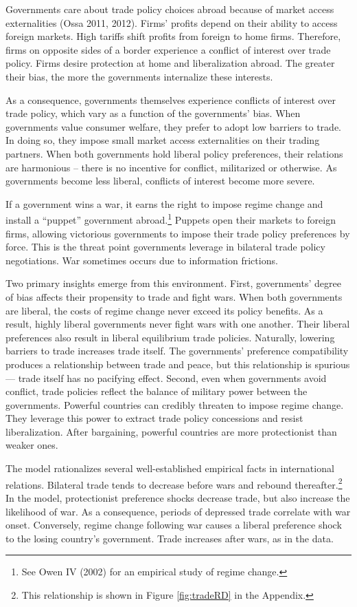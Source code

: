 \documentclass{puthesis}
\begin{document}
Governments care about trade policy choices abroad because of market
access externalities (Ossa 2011, 2012). Firms' profits depend on their
ability to access foreign markets. High tariffs shift profits from
foreign to home firms. Therefore, firms on opposite sides of a border
experience a conflict of interest over trade policy. Firms desire
protection at home and liberalization abroad. The greater their bias,
the more the governments internalize these interests.

As a consequence, governments themselves experience conflicts of
interest over trade policy, which vary as a function of the governments'
bias. When governments value consumer welfare, they prefer to adopt low
barriers to trade. In doing so, they impose small market access
externalities on their trading partners. When both governments hold
liberal policy preferences, their relations are harmonious -- there is
no incentive for conflict, militarized or otherwise. As governments
become less liberal, conflicts of interest become more severe.

If a government wins a war, it earns the right to impose regime change
and install a ``puppet'' government abroad.\footnote{See Owen IV (2002)
  for an empirical study of regime change.} Puppets open their markets
to foreign firms, allowing victorious governments to impose their trade
policy preferences by force. This is the threat point governments
leverage in bilateral trade policy negotiations. War sometimes occurs
due to information frictions.

Two primary insights emerge from this environment. First, governments'
degree of bias affects their propensity to trade and fight wars. When
both governments are liberal, the costs of regime change never exceed
its policy benefits. As a result, highly liberal governments never fight
wars with one another. Their liberal preferences also result in liberal
equilibrium trade policies. Naturally, lowering barriers to trade
increases trade itself. The governments' preference compatibility
produces a relationship between trade and peace, but this relationship
is spurious --- trade itself has no pacifying effect. Second, even when
governments avoid conflict, trade policies reflect the balance of
military power between the governments. Powerful countries can credibly
threaten to impose regime change. They leverage this power to extract
trade policy concessions and resist liberalization. After bargaining,
powerful countries are more protectionist than weaker ones.

The model rationalizes several well-established empirical facts in
international relations. Bilateral trade tends to decrease before wars
and rebound thereafter.\footnote{This relationship is shown in Figure
  \ref{fig:tradeRD} in the Appendix.} In the model, protectionist
preference shocks decrease trade, but also increase the likelihood of
war. As a consequence, periods of depressed trade correlate with war
onset. Conversely, regime change following war causes a liberal
preference shock to the losing country's government. Trade increases
after wars, as in the data.
\end{document}
